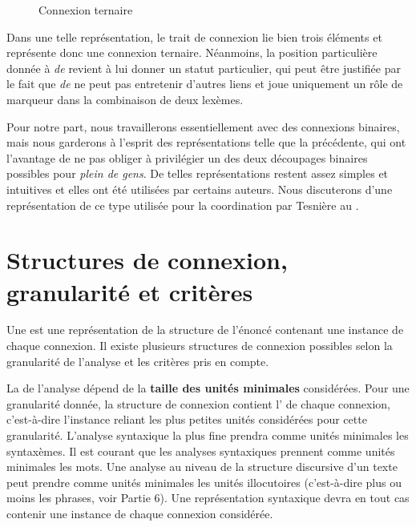 {    \begin{figure}
    \caption{\label{fig:}Connexion ternaire}
    \end{figure}

    Dans une telle représentation, le trait de connexion lie bien trois éléments et représente donc une connexion ternaire. Néanmoins, la position particulière donnée à \textit{de} revient à lui donner un statut particulier, qui peut être justifiée par le fait que \textit{de} ne peut pas entretenir d’autres liens et joue uniquement un rôle de marqueur dans la combinaison de deux lexèmes.

    Pour notre part, nous travaillerons essentiellement avec des connexions binaires, mais nous garderons à l’esprit des représentations telle que la précédente, qui ont l’avantage de ne pas obliger à privilégier un des deux découpages binaires possibles pour \textit{plein de gens}. De telles représentations restent assez simples et intuitives et elles ont été utilisées par certains auteurs. Nous discuterons d’une représentation de ce type utilisée pour la coordination par Tesnière au .
}
\section{Structures de connexion, granularité et critères}\label{sec:3.2.18}

Une  est une représentation de la structure de l’énoncé contenant une instance de chaque connexion. Il existe plusieurs structures de connexion possibles selon la granularité de l’analyse et les critères pris en compte.

La  de l’analyse dépend de la \textbf{taille des unités minimales} considérées. Pour une granularité donnée, la structure de connexion contient l’ de chaque connexion, c’est-à-dire l’instance reliant les plus petites unités considérées pour cette granularité. L’analyse syntaxique la plus fine prendra comme unités minimales les syntaxèmes. Il est courant que les analyses syntaxiques prennent comme unités minimales les mots. Une analyse au niveau de la structure discursive d’un texte peut prendre comme unités minimales les unités illocutoires (c’est-à-dire plus ou moins les phrases, voir Partie 6). Une représentation syntaxique devra en tout cas contenir une instance de chaque connexion considérée.

